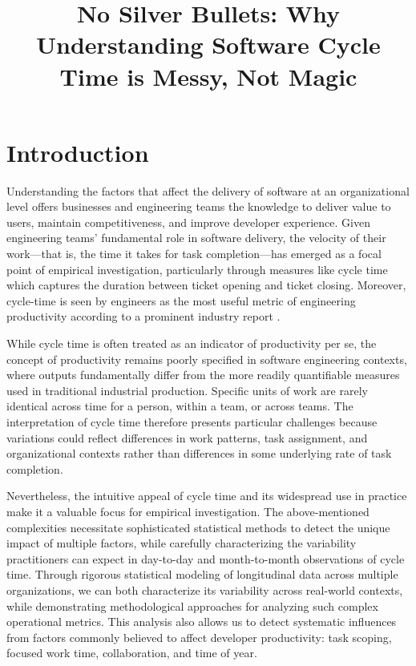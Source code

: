 \documentclass[
  sn-mathphys-ay,
]{sn-jnl}
\title[No Silver Bullets: Why Understanding Software Cycle Time is
Messy, Not Magic]{No Silver Bullets: Why Understanding Software Cycle
Time is Messy, Not Magic}
\author*[aff-1]{\fnm{John C.} \sur{Flournoy}}\email{jcflournoyphd@pm.me}\author[aff-1]{\fnm{Carol S.} \sur{Lee}}\author[aff-1]{\fnm{Catherine M.} \sur{Hicks}}\email{cat-hicks@pluralsight.com}\author[aff-1]{\fnm{Maggie} \sur{Wu}}\email{maggie-wu@pluralsight.com}
\affil[aff-1]{, \orgname{Pluralsight}}
\begin{document}
\maketitle


\section{Introduction}\label{introduction}

Understanding the factors that affect the delivery of software at an
organizational level offers businesses and engineering teams the
knowledge to deliver value to users, maintain competitiveness, and
improve developer experience. Given engineering teams' fundamental role
in software delivery, the velocity of their work---that is, the time it
takes for task completion---has emerged as a focal point of empirical
investigation, particularly through measures like cycle time which
captures the duration between ticket opening and ticket closing.
Moreover, cycle-time is seen by engineers as the most useful metric of
engineering productivity according to a prominent industry report
\citep{careyWhy70Engineers2024}.

While cycle time is often treated as an indicator of productivity per
se, the concept of productivity remains poorly specified in software
engineering contexts, where outputs fundamentally differ from the more
readily quantifiable measures used in traditional industrial production.
Specific units of work are rarely identical across time for a person,
within a team, or across teams. The interpretation of cycle time
therefore presents particular challenges because variations could
reflect differences in work patterns, task assignment, and
organizational contexts rather than differences in some underlying rate
of task completion.

Nevertheless, the intuitive appeal of cycle time and its widespread use
in practice make it a valuable focus for empirical investigation. The
above-mentioned complexities necessitate sophisticated statistical
methods to detect the unique impact of multiple factors, while carefully
characterizing the variability practitioners can expect in day-to-day
and month-to-month observations of cycle time. Through rigorous
statistical modeling of longitudinal data across multiple organizations,
we can both characterize its variability across real-world contexts,
while demonstrating methodological approaches for analyzing such complex
operational metrics. This analysis also allows us to detect systematic
influences from factors commonly believed to affect developer
productivity: task scoping, focused work time, collaboration, and time
of year.
\end{document}
